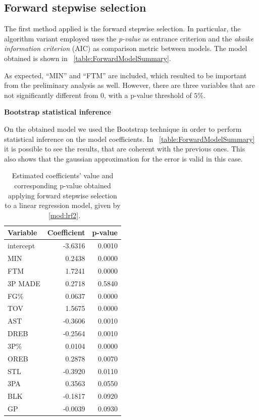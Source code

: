 \subsection{Forward stepwise selection}

The first method applied is the forward stepwise selection. In particular, the algorithm variant employed uses the \textit{p-value} as entrance criterion and the \textit{akaike information criterion} (AIC) as comparison metric between models. The model obtained is shown in \Tab~\ref{table:ForwardModelSummary}.

As expected, ``MIN'' and ``FTM'' are included, which resulted to be important from the preliminary analysis as well. However, there are three variables that are not significantly different from 0, with a p-value threshold of $5\%$.

\textbf{Bootstrap statistical inference}

On the obtained model we used the Bootstrap technique in order to perform statistical inference on the model coefficients. In \Tab~\ref{table:ForwardModelSummary} it is possible to see the results, that are coherent with the previous ones. This also shows that the gaussian approximation for the error is valid in this case. 

\begin{center}
\end{center}

\begin{table}[H]
	\centering
	\begin{tabular}{|| l | r | r ||} 
		\hline
		Variable & Coefficient & p-value \\
		\hline
		intercept & -3.6316 & 0.0010 \\
		MIN & 0.2438 & 0.0000 \\
		FTM & 1.7241 & 0.0000 \\
		3P MADE & 0.2718 & 0.5840 \\
		FG\% & 0.0637 & 0.0000 \\
		TOV & 1.5675 & 0.0000 \\
		AST & -0.3606 & 0.0010 \\
		DREB & -0.2564 & 0.0010 \\
		3P\% & 0.0104 & 0.0000 \\
		OREB & 0.2878 & 0.0070 \\
		STL & -0.3920 & 0.0110 \\
		3PA & 0.3563 & 0.0550 \\
		BLK & -0.1817 & 0.0920 \\
		GP & -0.0039 & 0.0930 \\
		\hline
	\end{tabular}
	\caption{Estimated coefficients' value and corresponding p-value obtained applying forward stepwise selection to a linear regression model, given by \Mod~\ref{mod:lrf2}.}
	\label{table:BootForwardModel}
\end{table}

